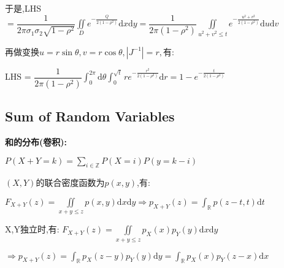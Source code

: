 \begin{enumerate}
    于是,LHS$ =\dfrac{1}{2\pi\sigma_1\sigma_2\sqrt{1-\rho^2}}\iint\limits_{D}e^{-\frac{Q}{2(1-\rho^2)}}\mathrm{d}x\mathrm{d}y = \dfrac{1}{2\pi(1-\rho^2)}\iint\limits_{u^2+v^2\le t}e^{-\frac{u^2+v^2}{2(1-\rho^2)}}\mathrm{d}u\mathrm{d}v$

    再做变换$ u = r\sin\theta, v=r\cos\theta, |J^{-1}| = r,有:$

    LHS = $\dfrac{1}{2\pi(1-\rho^2)}\int_{0}^{2\pi}{\mathrm{d}\theta}\int_{0}^{\sqrt{t}}{re^{-\frac{r^2}{2(1-\rho^2)}}\mathrm{d}r}  = 1-e^{-\frac{t}{2(1-\rho^2)}}$

\end{enumerate}

\subsection{Sum of Random Variables}
\textbf{和的分布(卷积):}

$P(X+Y=k) = \sum_{i\in \mathbb{Z}}{P(X=i)P(y=k-i)}$

$(X,Y)$的联合密度函数为$ p(x,y)$,有:

$F_{X+Y}(z) = \iint\limits_{x+y\le z}p(x,y)\mathrm{d}x\mathrm{d}y \Rightarrow p_{X+Y}(z)=\int_{\mathbb{R}}p(z-t,t)\mathrm{d}t$

X,Y独立时,有: $F_{X+Y}(z) = \iint\limits_{x+y\le z}p_X(x)p_Y(y)\mathrm{d}x\mathrm{d}y $

$\Rightarrow p_{X+Y}(z)= \int_{\mathbb{R}}p_X(z-y)p_Y(y)\mathrm{d}y=\int_{\mathbb{R}}{p_X(x)p_Y(z-x)\mathrm{d}x}$

